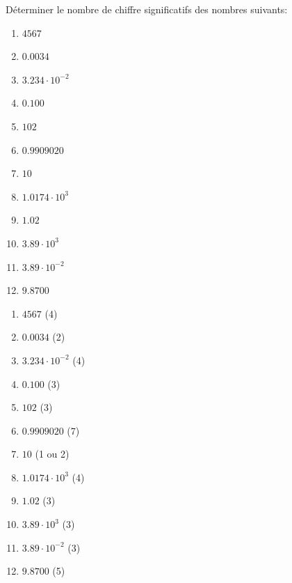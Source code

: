 \documentclass[
  11pt,
  a4paper,
  openany]{book}
\providecommand{\tightlist}{%
  \setlength{\itemsep}{0pt}\setlength{\parskip}{0pt}}
\begin{document}
\begin{Exercise}

Déterminer le nombre de chiffre significatifs des nombres suivants:

\begin{multicols}{4}

\begin{enumerate}
\def\labelenumi{\alph{enumi}.}
\tightlist
\item
  \(4567\)
\item
  \(0.0034\)
\item
  \(3.234 \cdot 10^{-2}\)
\item
  \(0.100\)
\item
  \(102\)
\item
  \(0.9909020\)
\item
  \(10\)
\item
  \(1.0174 \cdot 10^3\)
\item
  \(1.02\)
\item
  \(3.89 \cdot 10^3\)
\item
  \(3.89 \cdot 10^{-2}\)
\item
  \(9.8700\)
\end{enumerate}

\end{multicols}

\end{Exercise}

\begin{Answer}

\begin{multicols}{4}

\begin{enumerate}
\def\labelenumi{\alph{enumi}.}
\tightlist
\item
  \(4567\) (4)
\item
  \(0.0034\) (2)
\item
  \(3.234 \cdot 10^{-2}\) (4)
\item
  \(0.100\) (3)
\item
  \(102\) (3)
\item
  \(0.9909020\) (7)
\item
  \(10\) (1 ou 2)
\item
  \(1.0174 \cdot 10^3\) (4)
\item
  \(1.02\) (3)
\item
  \(3.89 \cdot 10^3\) (3)
\item
  \(3.89 \cdot 10^{-2}\) (3)
\item
  \(9.8700\) (5)
\end{enumerate}

\end{multicols}

\end{Answer}
\end{document}
